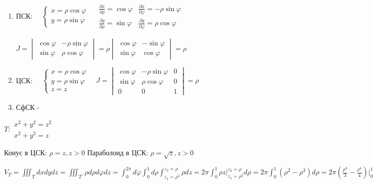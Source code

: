 \documentclass[12pt]{article}
\begin{document}
    \begin{enumerate}
        \item ПСК: $\quad \begin{cases}
                              x = \rho\cos\varphi \\ y = \rho\sin\varphi
        \end{cases} \quad
        \begin{matrix}
            \frac{\partial x}{\partial \rho} = \cos\varphi & \frac{\partial x}{\partial \varphi} = -\rho\sin\varphi \\
            \frac{\partial y}{\partial \rho} = \sin\varphi & \frac{\partial y}{\partial \varphi} = \rho\cos\varphi
        \end{matrix}$

        $J = \begin{vmatrix}\cos\varphi & -\rho\sin\varphi \\ \sin\varphi & \rho\cos\varphi\end{vmatrix} =
        \rho \begin{vmatrix}\cos\varphi & -\sin\varphi \\ \sin\varphi & \cos\varphi\end{vmatrix} = \rho$

        \item ЦСК: $\quad \begin{cases}
                              x = \rho\cos\varphi \\ y = \rho\sin\varphi \\ z = z
        \end{cases} \quad J = \begin{vmatrix}\cos\varphi & -\rho\sin\varphi & 0 \\ \sin\varphi & \rho\cos\varphi & 0 \\ 0 & 0 & 1\end{vmatrix} = \rho$

        \item СфСК - \Lab
    \end{enumerate}

    \Ex $T: \begin{matrix}x^2 + y^2 = z^2 \\ x^2 + y^2 = z\end{matrix}$

    Конус в ЦСК: $\rho = z, z > 0$
    Параболоид в ЦСК: $\rho = \sqrt{z}, z > 0$

    $V_T = \iiint_T dxdydz = \iiint_{T^\prime}\rho d\rho d\varphi dz = \int_0^{2\pi} d\varphi \int_0^1 d \rho \int_{z_1 = \rho^2}^{z_2=\rho} \rho dz =
    2\pi \int_0^1 \rho z \Big|_{z_1 = \rho^2}^{z_2=\rho} d\rho = 2\pi \int_0^1 (\rho^2 - \rho^3) d\rho =
    2\pi (\frac{\rho^3}{3} - \frac{\rho^4}{4}) \Big|_0^1 = 2\pi (\frac{1}{3} - \frac{1}{4}) = \frac{\pi}{6}$
\end{document}
